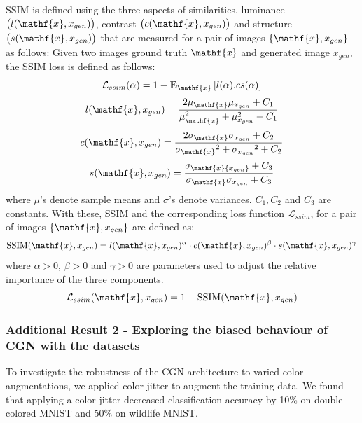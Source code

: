 \begin{appendices}
SSIM \cite{wang2004image} is defined using the three aspects of similarities, luminance $\big(l(\mathf{x}, x_{gen})\big)$, contrast $\big(c(\mathf{x}, x_{gen})\big)$ and structure $\big(s(\mathf{x}, x_{gen})\big)$ that are measured for a pair of images $\{\mathf{x}, x_{gen}\}$ as follows:
Given two images ground truth $\mathf{x}$ and generated image $x_{gen}$, the SSIM \cite{wang2004image} loss is defined \cite{pandey2020unsupervised} as follows:
\begin{equation}
\mathcal{L}_{ssim}(\alpha) = 1-\mathbf{E}_\mathf{x}\left[l(\alpha).cs(\alpha)\right]
\label{ssim_loss}
\end{equation}
\begin{equation}
l(\mathf{x}, x_{gen}) = \frac{2\mu_\mathf{x}\mu_{x_{gen}}+C_1}{\mu_\mathf{x}^2+ \mu_{x_{gen}}^2 + C_1}
\end{equation}
\begin{equation}
c(\mathf{x}, x_{gen}) = \frac{2\sigma_{\mathf{x}}\sigma_{x_{gen}}+C_2}{{\sigma_\mathf{x}}^2+ {\sigma_{x_{gen}}}^2 + C_2}
\end{equation}
\begin{equation}
s(\mathf{x}, x_{gen}) = \frac{\sigma_{\mathf{x}{x_{gen}}}+C_3}{\sigma_{\mathf{x}}\sigma_{x_{gen}} + C_3}
\end{equation}
where $\mu$'s denote sample means and $\sigma$'s denote variances. $C_1, C_2$ and $C_3$ are constants. With these, SSIM and the corresponding loss function $\mathcal{L}_{ssim}$, for a pair of images $\{\mathf{x}, x_{gen}\}$ are defined as: 
\begin{equation}
\text{SSIM}(\mathf{x}, x_{gen}) = l(\mathf{x}, x_{gen})^{\alpha} \cdot c(\mathf{x}, x_{gen})^{\beta} \cdot s(\mathf{x}, x_{gen})^{\gamma}  
\end{equation}
where $\alpha>0$, $\beta>0$ and $\gamma>0$ are parameters used to adjust the relative importance of the three components.
\begin{equation}
\mathcal{L}_{ssim}(\mathf{x}, x_{gen}) = 1 - \text{SSIM}(\mathf{x}, x_{gen})
\end{equation}

\subsubsection{Additional Result 2 - Exploring the biased behaviour of CGN\cite{sauer2021counterfactual} with the datasets}


To investigate the robustness of the CGN architecture \cite{sauer2021counterfactual} to varied color augmentations, we applied color jitter to augment the training data. We found that applying a color jitter decreased classification accuracy by 10\% on double-colored MNIST and 50\% on wildlife MNIST.



\end{appendices}
